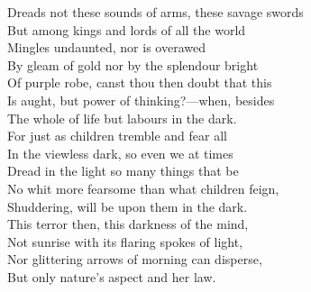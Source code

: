 Dreads not these sounds of arms, these savage swords\\
But among kings and lords of all the world\\
Mingles undaunted, nor is overawed\\
By gleam of gold nor by the splendour bright\\
Of purple robe, canst thou then doubt that this\\
Is aught, but power of thinking?—when, besides\\
The whole of life but labours in the dark.\\
For just as children tremble and fear all\\
In the viewless dark, so even we at times\\
Dread in the light so many things that be\\
No whit more fearsome than what children feign,\\
Shuddering, will be upon them in the dark.\\
This terror then, this darkness of the mind,\\
Not sunrise with its flaring spokes of light,\\
Nor glittering arrows of morning can disperse,\\
But only nature's aspect and her law.


